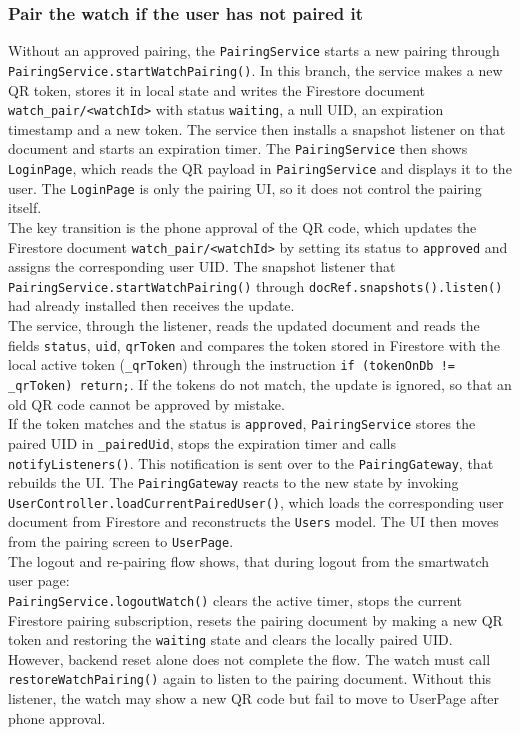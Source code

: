 \subsubsection{Pair the watch if the user has not paired it}
Without an approved pairing, the \texttt{PairingService} starts a new pairing through \\\texttt{PairingService.startWatchPairing()}. In this branch, the service makes a new QR token, stores it in local state and writes the Firestore document \texttt{watch\_pair/<watchId>} with status \texttt{waiting}, a null UID, an expiration timestamp and a new token. The service then installs a snapshot listener on that document and starts an expiration timer. The \texttt{PairingService} then shows \texttt{LoginPage}, which reads the QR payload in  \texttt{PairingService} and displays it to the user. The \texttt{LoginPage} is only the pairing UI, so it does not control the pairing itself. \\
The key transition is the phone approval of the QR code, which updates the Firestore document \texttt{watch\_pair/<watchId>} by setting its status to \texttt{approved} and assigns the corresponding user UID. The snapshot listener that \texttt{PairingService.startWatchPairing()} through \texttt{docRef.snapshots().listen()} had already installed then receives the update.\\

The service, through the listener, reads the updated document and reads the fields \texttt{status}, \texttt{uid}, \texttt{qrToken} and compares the token stored in Firestore with the local active token (\texttt{\_qrToken}) through the instruction \texttt{if (tokenOnDb != \_qrToken) return;}. If the tokens do not match, the update is ignored, so that an old QR code cannot be approved by mistake.\\
If the token matches and the status is \texttt{approved}, \texttt{PairingService} stores the paired UID in \texttt{\_pairedUid}, stops the expiration timer and calls \texttt{notifyListeners()}. This notification is sent over to the \texttt{PairingGateway}, that rebuilds the UI. The \texttt{PairingGateway} reacts to the new state by invoking \\ \texttt{UserController.loadCurrentPairedUser()}, which loads the corresponding user document from Firestore and reconstructs the \texttt{Users} model.  The UI then moves from the pairing screen to \texttt{UserPage}. \\

The logout and re-pairing flow shows, that during logout from the smartwatch user page: \\ \texttt{PairingService.logoutWatch()}  clears the active timer, stops the current Firestore pairing subscription, resets the pairing document by making a new QR token and restoring the \texttt{waiting} state and clears the locally paired UID. However, backend reset alone does not complete the flow. 
The watch must call \texttt{restoreWatchPairing()} again to listen to the pairing document. Without this listener, the watch may show a new QR code but fail to move to UserPage  after phone approval. \\


